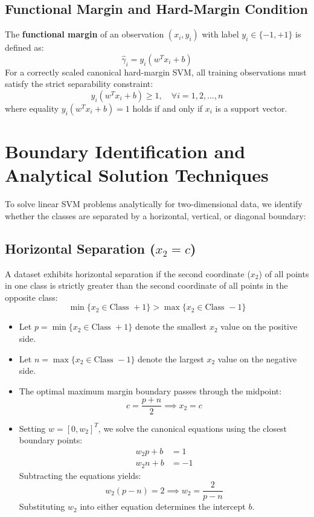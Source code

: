 \subsection{Functional Margin and Hard-Margin Condition}
The \textbf{functional margin} of an observation $(x_i, y_i)$ with label $y_i \in \{-1, +1\}$ is defined as:
\begin{equation}
\hat{\gamma}_i = y_i (w^T x_i + b)
\end{equation}
For a correctly scaled canonical hard-margin SVM, all training observations must satisfy the strict separability constraint:
\begin{equation}
y_i (w^T x_i + b) \ge 1, \quad \forall i = 1, 2, \dots, n
\end{equation}
where equality $y_i (w^T x_i + b) = 1$ holds if and only if $x_i$ is a support vector.

\section{Boundary Identification and Analytical Solution Techniques}

To solve linear SVM problems analytically for two-dimensional data, we identify whether the classes are separated by a horizontal, vertical, or diagonal boundary:

\subsection{Horizontal Separation (\texorpdfstring{$x_2 = c$}{x2 = c})}
A dataset exhibits horizontal separation if the second coordinate ($x_2$) of all points in one class is strictly greater than the second coordinate of all points in the opposite class:
\begin{equation}
\min\{x_2 \in \text{Class } +1\} > \max\{x_2 \in \text{Class } -1\}
\end{equation}
\begin{itemize}
    \item Let $p = \min\{x_2 \in \text{Class } +1\}$ denote the smallest $x_2$ value on the positive side.
    \item Let $n = \max\{x_2 \in \text{Class } -1\}$ denote the largest $x_2$ value on the negative side.
    \item The optimal maximum margin boundary passes through the midpoint:
    \begin{equation}
    c = \frac{p + n}{2} \implies x_2 = c
    \end{equation}
    \item Setting $w = [0, w_2]^T$, we solve the canonical equations using the closest boundary points:
    \begin{align}
    w_2 p + b &= 1 \\
    w_2 n + b &= -1
    \end{align}
    Subtracting the equations yields:
    \begin{equation}
    w_2 (p - n) = 2 \implies w_2 = \frac{2}{p - n}
    \end{equation}
    Substituting $w_2$ into either equation determines the intercept $b$.
\end{itemize}

